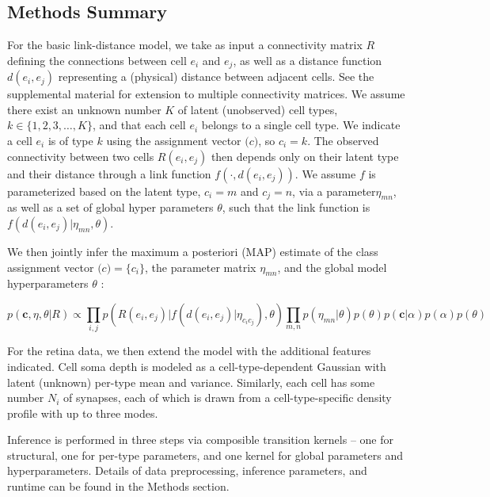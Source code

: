 \documentclass{nature}
\renewcommand{\vec}[1]{\mathbf{#1}}
\begin{document}
\subsection{Methods Summary}

For the basic link-distance model, we take as input a connectivity
matrix $R$ defining the connections between cell $e_i$ and $e_j$, as
well as a distance function $d(e_i, e_j)$ representing a (physical)
distance between adjacent cells.   See
the supplemental material for extension to multiple connectivity
matrices. We assume there exist an unknown number $K$ of latent
(unobserved) cell types, $k \in \{1, 2, 3, \dots, K\}$, and that each
cell $e_i$ belongs to a single cell type. We indicate a cell $e_i$ is
of type $k$ using the assignment vector $\vec(c)$, so $c_i = k$. The
observed connectivity between two cells $R(e_i, e_j)$ then depends
only on their latent type and their distance through a link function
$f(\cdot, d(e_i, e_j))$. We assume $f$ is parameterized based on the
latent type, $c_i=m$ and $c_j=n$, via a parameter$\eta_{mn}$, as well
as a set of global hyper parameters $\theta$, such that the link
function is $f(d(e_i, e_j) | \eta_{mn}, \theta)$.

We then jointly infer the maximum a posteriori (MAP) estimate of the
class assignment vector $\vec(c) = \{c_i\}$, the parameter matrix
$\eta_{mn}$, and the global model hyperparameters $\theta$ :

\begin{equation}
  p(\vec{c}, \eta, \theta | R ) \propto \prod_{i, j} p(R(e_i, e_j) | f(d(e_i, e_j) | \eta_{c_ic_j}), \theta) \prod_{m, n} p(\eta_{mn} | \theta)  p(\theta) p(\vec{c} | \alpha) p(\alpha) p(\theta)
\end{equation}

For the retina data, we then extend the model with the additional
features indicated. Cell soma depth is modeled as a
cell-type-dependent Gaussian with latent (unknown) per-type mean and
variance. Similarly, each cell has some number $N_i$ of synapses, 
each of which is drawn from a cell-type-specific density profile
with up to three modes.


Inference is performed in three steps via composible transition 
kernels -- one for structural, one for per-type parameters, and
one kernel for global parameters and hyperparameters. Details
of data preprocessing, inference parameters, and runtime can
be found in the Methods section. 

\printbibliography
\end{document}
